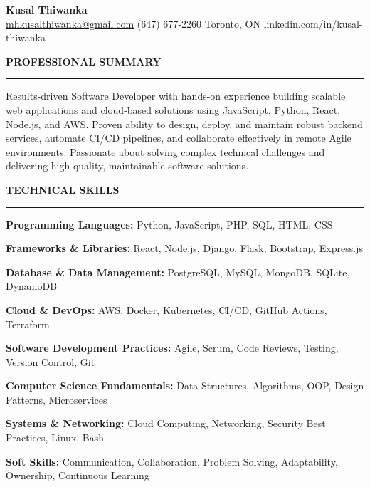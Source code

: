 \documentclass[10pt,letterpaper]{article}
\begin{document}
\begin{center}
{\LARGE\textbf{Kusal Thiwanka}}\\[3pt]
\href{mailto:mhkusalthiwanka@gmail.com}{mhkusalthiwanka@gmail.com}\hspace{2em}%
(647) 677{-}2260\hspace{2em}%
Toronto, ON\hspace{2em}
linkedin.com/in/kusal-thiwanka
\end{center}

\vspace{6pt}

\textbf{PROFESSIONAL SUMMARY}\\[-8pt]
\noindent\rule{\textwidth}{1pt}

\vspace{-2pt}

Results-driven Software Developer with hands-on experience building scalable web applications and cloud-based solutions using JavaScript, Python, React, Node.js, and AWS. Proven ability to design, deploy, and maintain robust backend services, automate CI/CD pipelines, and collaborate effectively in remote Agile environments. Passionate about solving complex technical challenges and delivering high-quality, maintainable software solutions.

\vspace{8pt}

\textbf{TECHNICAL SKILLS}\\[-8pt]
\noindent\rule{\textwidth}{1pt}

\vspace{-2pt}

\textbf{Programming Languages:} Python, JavaScript, PHP, SQL, HTML, CSS

\textbf{Frameworks \& Libraries:} React, Node.js, Django, Flask, Bootstrap, Express.js

\textbf{Database \& Data Management:} PostgreSQL, MySQL, MongoDB, SQLite, DynamoDB

\textbf{Cloud \& DevOps:} AWS, Docker, Kubernetes, CI/CD, GitHub Actions, Terraform

\textbf{Software Development Practices:} Agile, Scrum, Code Reviews, Testing, Version Control, Git

\textbf{Computer Science Fundamentals:} Data Structures, Algorithms, OOP, Design Patterns, Microservices

\textbf{Systems \& Networking:} Cloud Computing, Networking, Security Best Practices, Linux, Bash

\textbf{Soft Skills:} Communication, Collaboration, Problem Solving, Adaptability, Ownership, Continuous Learning
\end{document}
